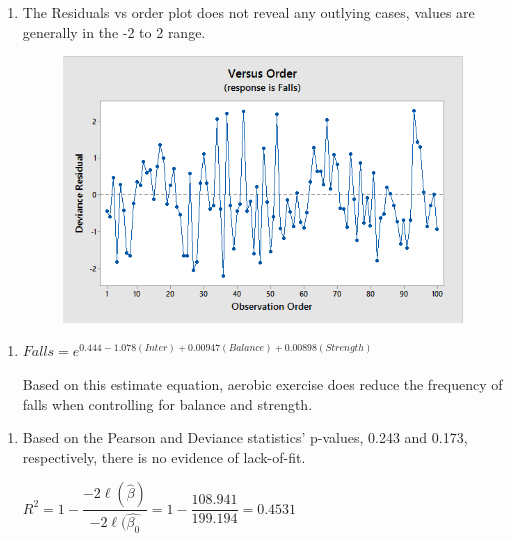 \documentclass{article}
\providecommand{\tightlist}{%
      \setlength{\itemsep}{0pt}\setlength{\parskip}{0pt}}
\begin{document}
\begin{enumerate}
\def\labelenumi{\alph{enumi})}
\setcounter{enumi}{2}
\tightlist
\item
  The Residuals vs order plot does not reveal any outlying cases, values
  are generally in the -2 to 2 range.
  
  \begin{figure}[h!]
 \centering
 \includegraphics[scale=.4]{./images/plot_residuals-vs-order.png}
\end{figure}

\end{enumerate}

\newpage
\begin{enumerate}
\def\labelenumi{\alph{enumi})}
\setcounter{enumi}{3}
\tightlist
\item
  \(Falls = e^{0.444 - 1.078(Inter) + 0.00947(Balance) + 0.00898(Strength)}\)
  
  
Based on this estimate equation, aerobic exercise does reduce the
frequency of falls when controlling for balance and strength.
\end{enumerate}


\begin{enumerate}
\def\labelenumi{\alph{enumi})}
\setcounter{enumi}{4}
\tightlist
\item
  Based on the Pearson and Deviance statistics' p-values, 0.243 and
  0.173, respectively, there is no evidence of lack-of-fit.

  \(R^2 = 1 - \dfrac{-2\ell(\hat{\beta})}{-2\ell(\hat{\beta_0}} = 1 - \dfrac{108.941}{199.194} = 0.4531\)
  \end{enumerate}


    
    
    
    
\end{document}
